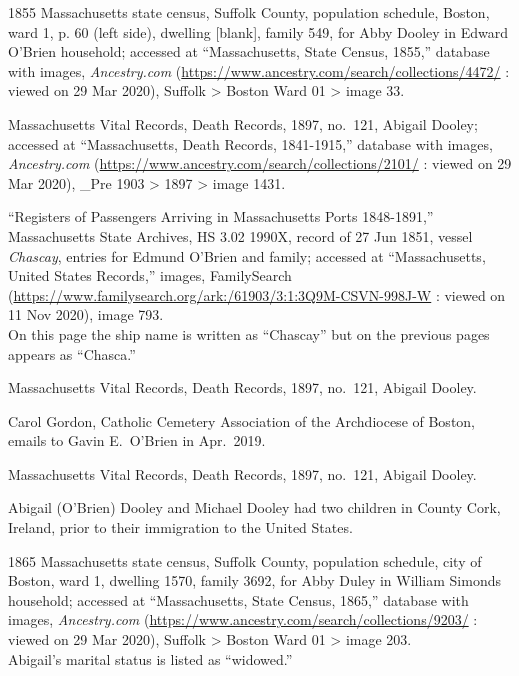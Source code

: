 \begin{thebibliography}{999}



1855 Massachusetts state census, Suffolk County, population schedule, Boston, ward 1, p. 60 (left side), dwelling [blank], family 549, for Abby Dooley in Edward O'Brien household; accessed at ``Massachusetts, State Census, 1855,'' database with images, \textit{Ancestry.com} (\url{https://www.ancestry.com/search/collections/4472/} : viewed on 29 Mar 2020), Suffolk > Boston Ward 01 > image 33.

Massachusetts Vital Records, Death Records, 1897, no.\ 121, Abigail Dooley; accessed at ``Massachusetts, Death Records, 1841-1915,'' database with images, \textit{Ancestry.com} (\url{https://www.ancestry.com/search/collections/2101/} : viewed on 29 Mar 2020), \_Pre 1903 > 1897 > image 1431.

``Registers of Passengers Arriving in Massachusetts Ports 1848-1891,'' Massachusetts State Archives, HS 3.02 1990X, record of 27 Jun 1851, vessel \textit{Chascay}, entries for Edmund O'Brien and family; accessed at ``Massachusetts, United States Records,'' images, FamilySearch (\url{https://www.familysearch.org/ark:/61903/3:1:3Q9M-CSVN-998J-W} : viewed on 11 Nov 2020), image 793.\\
On this page the ship name is written as ``Chascay'' but on the previous pages appears as ``Chasca.''

Massachusetts Vital Records, Death Records, 1897, no.\ 121, Abigail Dooley.

Carol Gordon, Catholic Cemetery Association of the Archdiocese of Boston, emails to Gavin E.\ O'Brien in Apr.\ 2019.

Massachusetts Vital Records, Death Records, 1897, no.\ 121, Abigail Dooley.

Abigail (O'Brien) Dooley and Michael Dooley had two children in County Cork, Ireland, prior to their immigration to the United States. 

1865 Massachusetts state census, Suffolk County, population schedule, city of Boston, ward 1, dwelling 1570, family 3692, for Abby Duley in William Simonds household; accessed at ``Massachusetts, State Census, 1865,'' database with images, \textit{Ancestry.com} (\url{https://www.ancestry.com/search/collections/9203/} : viewed on 29 Mar 2020), Suffolk > Boston Ward 01 > image 203.\\
Abigail's marital status is listed as ``widowed.''


\end{thebibliography}

